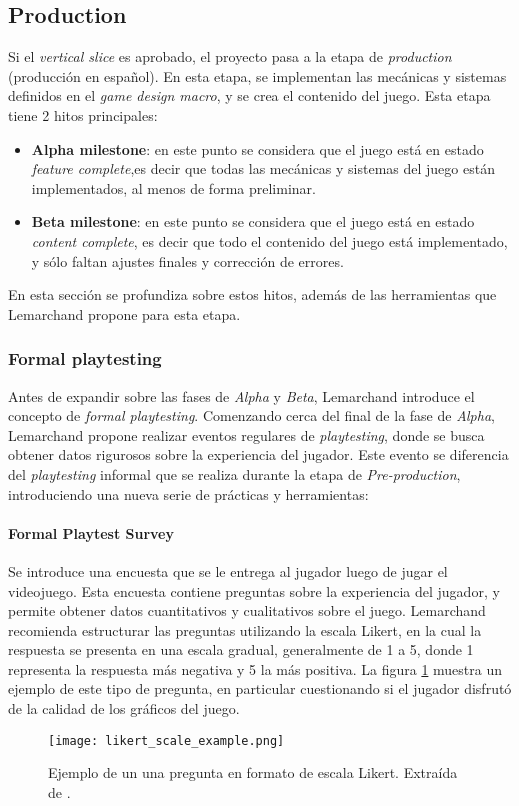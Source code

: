 \subsection{Production}
\par Si el \textit{vertical slice} es aprobado, el proyecto pasa a la etapa de \textit{production} (producción en español). En esta etapa, se implementan las mecánicas y sistemas definidos en el \textit{game design macro}, y se crea el contenido del juego. Esta etapa tiene 2 hitos principales:
\begin{itemize}
    \item \textbf{Alpha milestone}: en este punto se considera que el juego está en estado \textit{feature complete},es decir que todas las mecánicas y sistemas del juego están implementados, al menos de forma preliminar.
    \item \textbf{Beta milestone}: en este punto se considera que el juego está en estado \textit{content complete}, es decir que todo el contenido del juego está implementado, y sólo faltan ajustes finales y corrección de errores.
\end{itemize}
\par En esta sección se profundiza sobre estos hitos, además de las herramientas que Lemarchand propone para esta etapa.
%
%
\subsubsection{Formal playtesting}
\par Antes de expandir sobre las fases de \textit{Alpha} y \textit{Beta}, Lemarchand introduce el concepto de \textit{formal playtesting}. Comenzando cerca del final de la fase de \textit{Alpha}, Lemarchand propone realizar eventos regulares de \textit{playtesting}, donde se busca obtener datos rigurosos sobre la experiencia del jugador. Este evento se diferencia del \textit{playtesting} informal que se realiza durante la etapa de \textit{Pre-production}, introduciendo una nueva serie de prácticas y herramientas:
\paragraph{Formal Playtest Survey} Se introduce una encuesta que se le entrega al jugador luego de jugar el videojuego. Esta encuesta contiene preguntas sobre la experiencia del jugador, y permite obtener datos cuantitativos y cualitativos sobre el juego. Lemarchand recomienda estructurar las preguntas utilizando la escala Likert, en la cual la respuesta se presenta en una escala gradual, generalmente de 1 a 5, donde 1 representa la respuesta más negativa y 5 la más positiva. La figura \ref{fig:x escala Likert Lemarchand} muestra un ejemplo de este tipo de pregunta, en particular cuestionando si el jugador disfrutó de la calidad de los gráficos del juego.
\begin{figure}[H]
    \centering
    \texttt{[image: likert\_scale\_example.png]}
    \caption{Ejemplo de un una pregunta en formato de escala Likert. Extraída de \cite{lemarchandPlayfulProductionProcess2021}.}
    \label{fig:x escala Likert Lemarchand}
\end{figure}
